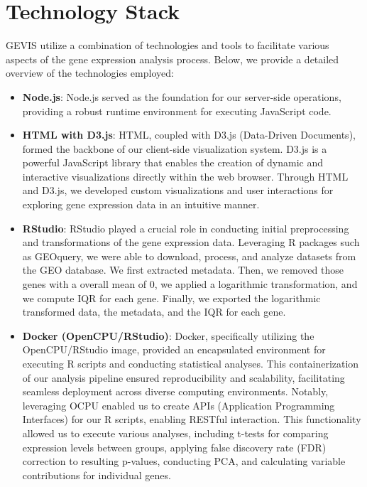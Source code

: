 \documentclass[
	a4paper, %
	10pt, %
	unnumberedsections, %
	twoside, %
]{LTJournalArticle}
\begin{document}
\section{Technology Stack}

GEVIS utilize a combination of technologies and tools to facilitate various aspects of the gene expression analysis process. Below, we provide a detailed overview of the technologies employed:

\begin{itemize}
    \item \textbf{Node.js}: Node.js served as the foundation for our server-side operations, providing a robust runtime environment for executing JavaScript code. 
    
    \item \textbf{HTML with D3.js}: HTML, coupled with D3.js (Data-Driven Documents), formed the backbone of our client-side visualization system. D3.js is a powerful JavaScript library that enables the creation of dynamic and interactive visualizations directly within the web browser. Through HTML and D3.js, we developed custom visualizations and user interactions for exploring gene expression data in an intuitive manner.
    
    \item \textbf{RStudio}: RStudio played a crucial role in conducting initial preprocessing and transformations of the gene expression data. Leveraging R packages such as GEOquery, we were able to download, process, and analyze datasets from the GEO database. We first extracted metadata. Then, we removed those genes with a overall mean of 0, we applied a logarithmic transformation, and we compute IQR for each gene. Finally, we exported the logarithmic transformed data, the metadata, and the IQR for each gene.
    
    \item \textbf{Docker (OpenCPU/RStudio)}: Docker, specifically utilizing the OpenCPU/RStudio image, provided an encapsulated environment for executing R scripts and conducting statistical analyses. This containerization of our analysis pipeline ensured reproducibility and scalability, facilitating seamless deployment across diverse computing environments. Notably, leveraging OCPU enabled us to create APIs (Application Programming Interfaces) for our R scripts, enabling RESTful interaction. This functionality allowed us to execute various analyses, including t-tests for comparing expression levels between groups, applying false discovery rate (FDR) correction to resulting p-values, conducting PCA, and calculating variable contributions for individual genes.
\end{itemize}
\end{document}
